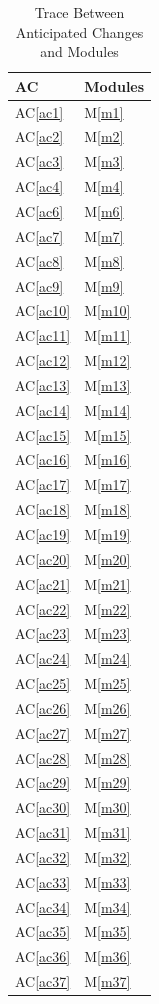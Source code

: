 \documentclass[12pt, titlepage]{article}
\newcommand{\acref}[1]{AC\ref{#1}}
\newcommand{\mref}[1]{M\ref{#1}}
\begin{document}
	\begin{longtable}{p{} p{}}
		\caption{Trace Between Anticipated Changes and Modules}
		\label{TblACT}\\
		\toprule
		\textbf{AC} & \textbf{Modules}\\
		\midrule
		\acref{ac1} & \mref{m1}\\
		\acref{ac2} & \mref{m2}\\
		\acref{ac3} & \mref{m3}\\
		\acref{ac4} & \mref{m4}\\
		\acref{ac6} & \mref{m6}\\
		\acref{ac7} & \mref{m7}\\
		\acref{ac8} & \mref{m8}\\
		\acref{ac9} & \mref{m9}\\
		\acref{ac10} & \mref{m10}\\
		\acref{ac11} & \mref{m11}\\
		\acref{ac12} & \mref{m12}\\
		\acref{ac13} & \mref{m13}\\
		\acref{ac14} & \mref{m14}\\
		\acref{ac15} & \mref{m15}\\
		\acref{ac16} & \mref{m16}\\
		\acref{ac17} & \mref{m17}\\
		\acref{ac18} & \mref{m18}\\
		\acref{ac19} & \mref{m19}\\
		\acref{ac20} & \mref{m20}\\
		\acref{ac21} & \mref{m21}\\
		\acref{ac22} & \mref{m22}\\
		\acref{ac23} & \mref{m23}\\
		\acref{ac24} & \mref{m24}\\
		\acref{ac25} & \mref{m25}\\
		\acref{ac26} & \mref{m26}\\
		\acref{ac27} & \mref{m27}\\
		\acref{ac28} & \mref{m28}\\
		\acref{ac29} & \mref{m29}\\
		\acref{ac30} & \mref{m30}\\
		\acref{ac31} & \mref{m31}\\
		\acref{ac32} & \mref{m32}\\
		\acref{ac33} & \mref{m33}\\
		\acref{ac34} & \mref{m34}\\
		\acref{ac35} & \mref{m35}\\
		\acref{ac36} & \mref{m36}\\
		\acref{ac37} & \mref{m37}\\
		
		\bottomrule
	\end{longtable}
\end{document}
